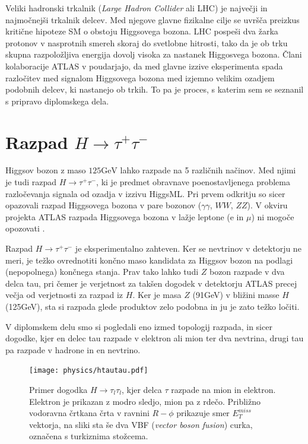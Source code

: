 \documentclass[11pt,a4paper,openany]{book}
\begin{document}
Veliki hadronski trkalnik (\textit{Large Hadron Collider} ali {LHC}) je največji in najmočnejši trkalnik delcev. Med njegove glavne fizikalne cilje se uvršča preizkus kritične hipoteze SM o obstoju Higgsovega bozona. LHC pospeši dva žarka protonov v nasprotnih smereh skoraj do svetlobne hitrosti, tako da je ob trku skupna razpoložljiva energija dovolj visoka za nastanek Higgosvega bozona. Člani kolaboracije ATLAS v \cite{AadScience2012} poudarjajo, da med glavne izzive eksperimenta spada razločitev med signalom Higgsovega bozona med izjemno velikim ozadjem podobnih delcev, ki nastanejo ob trkih. To pa je proces, s katerim sem se seznanil s pripravo diplomskega dela.

\section{Razpad $H \rightarrow \tau^+\tau^-$}

Higgsov bozon z maso $125\text{GeV}$ lahko razpade na 5 različnih načinov. Med njimi je tudi razpad $H \rightarrow \tau^+\tau^-$, ki je predmet obravnave poenostavljenega problema razločevanja signala od ozadja v izzivu HiggsML. Pri prvem odkritju so sicer opazovali razpad Higgsovega bozona v pare bozonov ($\gamma\gamma$, $WW$, $ZZ$). V okviru projekta ATLAS razpada Higgsovega bozona v lažje leptone (e in $\mu$) ni mogoče opozovati \cite{ChallengeDoc}.

Razpad $H \rightarrow \tau^+\tau^-$ je eksperimentalno zahteven. Ker se nevtrinov v detektorju ne meri, je težko ovrednotiti končno maso kandidata za Higgsov bozon na podlagi (nepopolnega) končnega stanja. Prav tako lahko tudi $Z$ bozon razpade v dva delca tau, pri čemer je verjetnost za takšen dogodek v detektorju ATLAS precej večja od verjetnosti za razpad iz $H$. Ker je masa $Z$ (91GeV) v bližini masse $H$ (125GeV), sta si razpada glede produktov zelo podobna in ju je zato težko ločiti.

V diplomskem delu smo si pogledali eno izmed topologij razpada, in sicer dogodke, kjer en delec tau razpade v elektron ali mion ter dva nevtrina, drugi tau pa razpade v hadrone in en nevtrino.

\begin{figure}[ht]
	\texttt{[image: physics/htautau.pdf]}
	
	\caption{Primer dogodka $H \rightarrow \tau_l\tau_l$, kjer delca $\tau$ razpade na mion in elektron. Elektron je prikazan z modro sledjo, mion pa z rdečo. Približno vodoravna črtkana črta v ravnini $R-\phi$ prikazuje smer $E_T^{miss}$ vektorja, na sliki sta še dva VBF (\textit{vector boson fusion}) curka, označena s turkiznima stožcema\cite{atlas2015htautau}.  }
	\label{htautau}
\end{figure}
\end{document}
